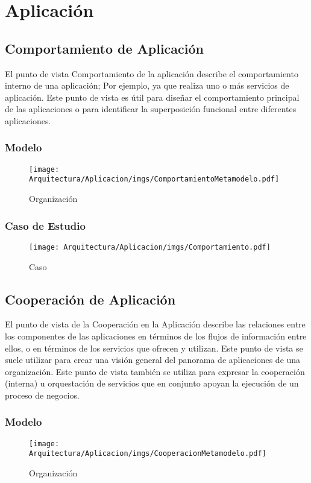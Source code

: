 \chapter{Aplicación}

\section{Comportamiento de Aplicación}
El punto de vista Comportamiento de la aplicación describe el comportamiento interno de una aplicación; Por ejemplo, ya que realiza uno o más servicios de aplicación. Este punto de vista es útil para diseñar el comportamiento principal de las aplicaciones o para identificar la superposición funcional entre diferentes aplicaciones.
\subsection{Modelo}
\begin{figure}[h!]
	\centering
	\texttt{[image: Arquitectura/Aplicacion/imgs/ComportamientoMetamodelo.pdf]}
	\caption{Organización}
\end{figure}
\newpage
\subsection{Caso de Estudio}

\begin{figure}[h!]
	\centering
	\texttt{[image: Arquitectura/Aplicacion/imgs/Comportamiento.pdf]}
	\caption{Caso}
\end{figure}

\newpage

\section{Cooperación de Aplicación}
El punto de vista de la Cooperación en la Aplicación describe las relaciones entre los componentes de las aplicaciones en términos de los flujos de información entre ellos, o en términos de los servicios que ofrecen y utilizan. Este punto de vista se suele utilizar para crear una visión general del panorama de aplicaciones de una organización. Este punto de vista también se utiliza para expresar la cooperación (interna) u orquestación de servicios que en conjunto apoyan la ejecución de un proceso de negocios.
\subsection{Modelo}
\begin{figure}[h!]
	\centering
	\texttt{[image: Arquitectura/Aplicacion/imgs/CooperacionMetamodelo.pdf]}
	\caption{Organización}
\end{figure}
\newpage
